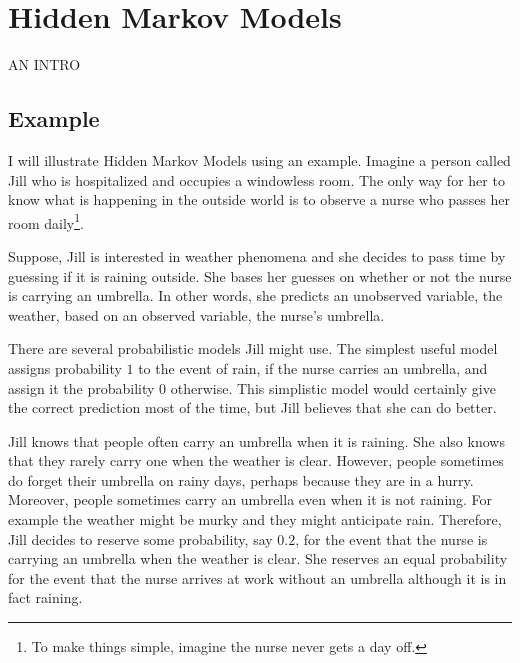 \chapter{Hidden Markov Models}

AN INTRO

\section{Example}

I will illustrate Hidden Markov Models using an example. Imagine a
person called Jill who is hospitalized and occupies a windowless
room. The only way for her to know what is happening in the outside
world is to observe a nurse who passes her room daily\footnote{To make things simple, imagine the nurse never gets a day
  off.}.

Suppose, Jill is interested in weather phenomena and she decides to
pass time by guessing if it is raining outside. She bases her guesses
on whether or not the nurse is carrying an umbrella. In other words,
she predicts an unobserved variable, the weather, based on an observed
variable, the nurse's umbrella.

There are several probabilistic models Jill might use. The simplest
useful model assigns probability $1$ to the event of rain, if the
nurse carries an umbrella, and assign it the probability $0$
otherwise. This simplistic model would certainly give the correct
prediction most of the time, but Jill believes that she can do better.

Jill knows that people often carry an umbrella when it is raining. She
also knows that they rarely carry one when the weather is
clear. However, people sometimes do forget their umbrella on
rainy days, perhaps because they are in a hurry. Moreover, people
sometimes carry an umbrella even when it is not raining. For example
the weather might be murky and they might anticipate rain. Therefore,
Jill decides to reserve some probability, say $0.2$, for the event
that the nurse is carrying an umbrella when the weather is clear. She
reserves an equal probability for the event that the nurse arrives at
work without an umbrella although it is in fact raining.
 
